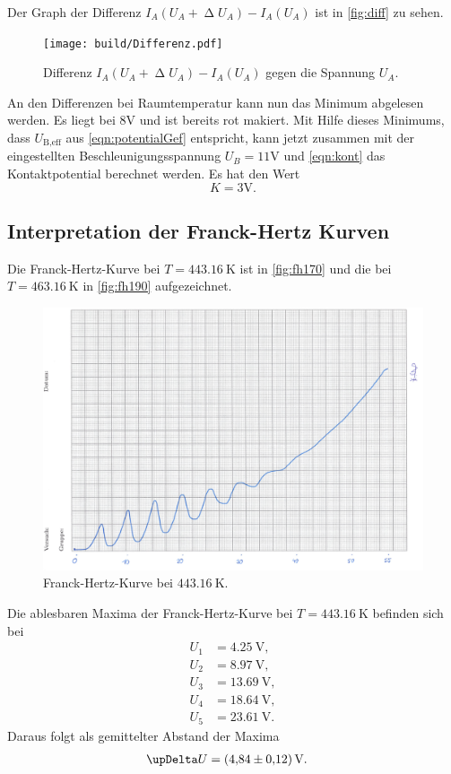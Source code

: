 \newpage
Der Graph der Differenz $I_A(U_A+\upDelta U_A)-I_A(U_A)$ ist in \autoref{fig:diff} zu sehen.
\begin{figure}[H]
    \centering
    \texttt{[image: build/Differenz.pdf]}
    \caption{Differenz $I_A(U_A+\upDelta U_A)-I_A(U_A)$ gegen die Spannung $U_A$.}
    \label{fig:diff}
\end{figure}

\noindent
An den Differenzen bei Raumtemperatur kann nun das Minimum abgelesen werden. Es liegt bei $8\si{\V}$ und ist bereits rot makiert.
Mit Hilfe dieses Minimums, dass $U_{\text{B,eff}}$ aus \autoref{eqn:potentialGef} entspricht, kann jetzt zusammen mit der eingestellten Beschleunigungsspannung
$U_B=11\si{\V}$ und \autoref{eqn:kont} das Kontaktpotential berechnet werden. Es hat den Wert
\begin{equation*}
    K=3\si{\V}.
\end{equation*}


\subsection{Interpretation der Franck-Hertz Kurven}
Die Franck-Hertz-Kurve bei $T = \SI{443,16}{\kelvin}$ ist in \autoref{fig:fh170} und die bei $T = \SI{463,16}{\kelvin}$ in \autoref{fig:fh190} aufgezeichnet.
\begin{figure}[H]
	\centering
	\includegraphics[width=0.7\linewidth]{data/Franck-Hertz170C.png}
	\caption{Franck-Hertz-Kurve bei $\SI{443,16}{\kelvin}$.}
	\label{fig:fh170}
\end{figure}

\noindent
Die ablesbaren Maxima der Franck-Hertz-Kurve bei $T = \SI{443,16}{\kelvin}$ befinden sich bei
\begin{align*}
  U_1 &= \SI{4,25}{\volt}, \\
  U_2 &= \SI{8,97}{\volt}, \\
  U_3 &= \SI{13,69}{\volt},\\
  U_4 &= \SI{18,64}{\volt},\\
  U_5 &= \SI{23,61}{\volt}.
\end{align*}
\noindent
Daraus folgt als gemittelter Abstand der Maxima
\begin{align*}
  \upDelta U &= \SI{4,84 \pm 0,12}{\volt}.
\end{align*}

